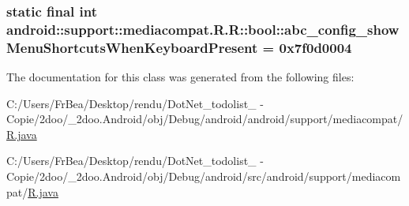 \hypertarget{classandroid_1_1support_1_1mediacompat_1_1_r_1_1bool_022eb74f49faacd872ccf2796a0e4790}{
\subsubsection[{abc\_\-config\_\-showMenuShortcutsWhenKeyboardPresent}]{\setlength{\rightskip}{0pt plus 5cm}static final int android::support::mediacompat.R.R::bool::abc\_\-config\_\-showMenuShortcutsWhenKeyboardPresent = 0x7f0d0004}}
\label{classandroid_1_1support_1_1mediacompat_1_1_r_1_1bool_022eb74f49faacd872ccf2796a0e4790}




The documentation for this class was generated from the following files:\begin{CompactItemize}
\item 
C:/Users/FrBea/Desktop/rendu/DotNet\_\-todolist\_ - Copie/2doo/\_\-2doo.Android/obj/Debug/android/android/support/mediacompat/\hyperlink{android_2support_2mediacompat_2_r_8java}{R.java}\item 
C:/Users/FrBea/Desktop/rendu/DotNet\_\-todolist\_ - Copie/2doo/\_\-2doo.Android/obj/Debug/android/src/android/support/mediacompat/\hyperlink{src_2android_2support_2mediacompat_2_r_8java}{R.java}\end{CompactItemize}
